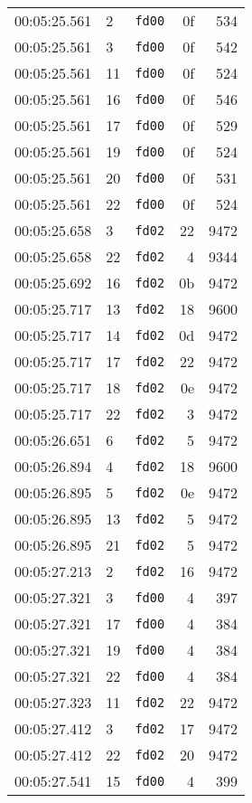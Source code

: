 \documentclass{article}
\begin{document}
\begin{longtable}{lllrr}
00:05:25.561 & 2 & \texttt{fd00} & 0f & 534 \\
00:05:25.561 & 3 & \texttt{fd00} & 0f & 542 \\
00:05:25.561 & 11 & \texttt{fd00} & 0f & 524 \\
00:05:25.561 & 16 & \texttt{fd00} & 0f & 546 \\
00:05:25.561 & 17 & \texttt{fd00} & 0f & 529 \\
00:05:25.561 & 19 & \texttt{fd00} & 0f & 524 \\
00:05:25.561 & 20 & \texttt{fd00} & 0f & 531 \\
00:05:25.561 & 22 & \texttt{fd00} & 0f & 524 \\
00:05:25.658 & 3 & \texttt{fd02} & 22 & 9472 \\
00:05:25.658 & 22 & \texttt{fd02} & 4 & 9344 \\
00:05:25.692 & 16 & \texttt{fd02} & 0b & 9472 \\
00:05:25.717 & 13 & \texttt{fd02} & 18 & 9600 \\
00:05:25.717 & 14 & \texttt{fd02} & 0d & 9472 \\
00:05:25.717 & 17 & \texttt{fd02} & 22 & 9472 \\
00:05:25.717 & 18 & \texttt{fd02} & 0e & 9472 \\
00:05:25.717 & 22 & \texttt{fd02} & 3 & 9472 \\
00:05:26.651 & 6 & \texttt{fd02} & 5 & 9472 \\
00:05:26.894 & 4 & \texttt{fd02} & 18 & 9600 \\
00:05:26.895 & 5 & \texttt{fd02} & 0e & 9472 \\
00:05:26.895 & 13 & \texttt{fd02} & 5 & 9472 \\
00:05:26.895 & 21 & \texttt{fd02} & 5 & 9472 \\
00:05:27.213 & 2 & \texttt{fd02} & 16 & 9472 \\
00:05:27.321 & 3 & \texttt{fd00} & 4 & 397 \\
00:05:27.321 & 17 & \texttt{fd00} & 4 & 384 \\
00:05:27.321 & 19 & \texttt{fd00} & 4 & 384 \\
00:05:27.321 & 22 & \texttt{fd00} & 4 & 384 \\
00:05:27.323 & 11 & \texttt{fd02} & 22 & 9472 \\
00:05:27.412 & 3 & \texttt{fd02} & 17 & 9472 \\
00:05:27.412 & 22 & \texttt{fd02} & 20 & 9472 \\
00:05:27.541 & 15 & \texttt{fd00} & 4 & 399 \\

\end{longtable}
\end{document}
